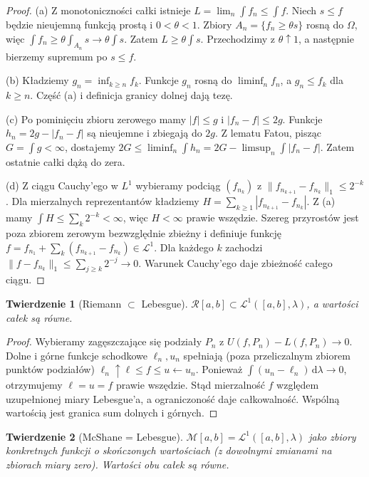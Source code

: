\documentclass[11pt,a4paper]{article}
\numberwithin{equation}{section}
\theoremstyle{plain}
\newtheorem{twierdzenie}{Twierdzenie}[section]
\theoremstyle{definition}
\theoremstyle{remark}
\begin{document}
\begin{proof}
(a) Z monotoniczności całki istnieje $L=\lim_n\int f_n\le\int f$. Niech $s\le f$ będzie nieujemną funkcją prostą i $0<\theta<1$. Zbiory $A_n=\{f_n\ge\theta s\}$ rosną do $\Omega$, więc $\int f_n\ge\theta\int_{A_n}s\to\theta\int s$. Zatem $L\ge\theta\int s$. Przechodzimy z $\theta\uparrow1$, a następnie bierzemy supremum po $s\le f$.

(b) Kładziemy $g_n=\inf_{k\ge n}f_k$. Funkcje $g_n$ rosną do $\liminf_nf_n$, a $g_n\le f_k$ dla $k\ge n$. Część (a) i definicja granicy dolnej dają tezę.

(c) Po pominięciu zbioru zerowego mamy $|f|\le g$ i $|f_n-f|\le2g$. Funkcje $h_n=2g-|f_n-f|$ są nieujemne i zbiegają do $2g$. Z lematu Fatou, pisząc $G=\int g<\infty$, dostajemy $2G\le\liminf_n\int h_n=2G-\limsup_n\int|f_n-f|$. Zatem ostatnie całki dążą do zera.

(d) Z ciągu Cauchy'ego w $L^1$ wybieramy podciąg $(f_{n_k})$ z $\|f_{n_{k+1}}-f_{n_k}\|_1\le2^{-k}$. Dla mierzalnych reprezentantów kładziemy $H=\sum_{k\ge1}|f_{n_{k+1}}-f_{n_k}|$. Z (a) mamy $\int H\le\sum_k2^{-k}<\infty$, więc $H<\infty$ prawie wszędzie. Szereg przyrostów jest poza zbiorem zerowym bezwzględnie zbieżny i definiuje funkcję $f=f_{n_1}+\sum_k(f_{n_{k+1}}-f_{n_k})\in\mathcal L^1$. Dla każdego $k$ zachodzi $\|f-f_{n_k}\|_1\le\sum_{j\ge k}2^{-j}\to0$. Warunek Cauchy'ego daje zbieżność całego ciągu.
\end{proof}
\begin{twierdzenie}[Riemann $\subset$ Lebesgue]
$\mathcal R[a,b]\subset\mathcal L^1([a,b],\lambda)$, a wartości całek są równe.
\end{twierdzenie}
\begin{proof}
Wybieramy zagęszczające się podziały $P_n$ z $U(f,P_n)-L(f,P_n)\to0$. Dolne i górne funkcje schodkowe $\ell_n,u_n$ spełniają (poza przeliczalnym zbiorem punktów podziałów) $\ell_n\uparrow\ell\le f\le u\leftarrow u_n$. Ponieważ $\int(u_n-\ell_n)\,\mathrm d\lambda\to0$, otrzymujemy $\ell=u=f$ prawie wszędzie. Stąd mierzalność $f$ względem uzupełnionej miary Lebesgue'a, a ograniczoność daje całkowalność. Wspólną wartością jest granica sum dolnych i górnych.
\end{proof}
\begin{twierdzenie}[McShane = Lebesgue]
$\mathcal M[a,b]=\mathcal L^1([a,b],\lambda)$ jako zbiory konkretnych funkcji o skończonych wartościach (z dowolnymi zmianami na zbiorach miary zero). Wartości obu całek są równe.
\end{twierdzenie}
\end{document}
